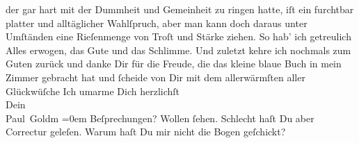 \begin{ledgroupsized}[t]{13cm}
               der gar hart mit der Dummheit und Gemeinheit zu ringen hatte, iſt ein furchtbar
               platter und alltäglicher Wahlſpruch, aber man kann doch daraus unter Umſtänden eine
               Rieſenmenge von {\pb}Troſt und Stärke ziehen.\pend
           \pstart
           So hab’ ich getreulich Alles erwogen, das Gute und das Schlimme. Und zuletzt kehre
               ich nochmals zum Guten zurück und danke Dir für die Freude, die das kleine blaue Buch in mein Zimmer gebracht
               hat und ſcheide von Dir mit dem allerwärmſten aller Glückwüſche{\dotstwo}\pend
           \pstart
           Ich umarme Dich herzlichſt {\\[\baselineskip]}Dein {\\[\baselineskip]}\spacefill\mbox{Paul Goldm}\pend
           \leftskip=0em{}\pstart
           \noindent{}Beſprechungen? Wollen ſehen. Schlecht haſt Du aber Correctur geleſen. Warum haſt
                  Du mir nicht die Bogen geſchickt?\pend
           \pstart
           \label{T_L02703-1v}\label{T_L02703-1h}\pend
           \endnumbering{}\end{ledgroupsized}\begin{anhang}\end{anhang}\newcommand{\dateiname}{L02703}\newcommand{\titel}{Paul Goldmann an Arthur Schnitzler, 2. 11. [1892]}\newcommand{\editorInnen}{Martin Anton Müller und Laura Untner}
      